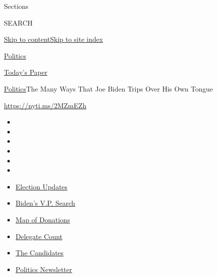 Sections

SEARCH

\protect\hyperlink{site-content}{Skip to
content}\protect\hyperlink{site-index}{Skip to site index}

\href{https://www.nytimes.com/section/politics}{Politics}

\href{https://myaccount.nytimes.com/auth/login?response_type=cookie\&client_id=vi}{}

\href{https://www.nytimes.com/section/todayspaper}{Today's Paper}

\href{/section/politics}{Politics}\textbar{}The Many Ways That Joe Biden
Trips Over His Own Tongue

\url{https://nyti.ms/2MZmEZh}

\begin{itemize}
\item
\item
\item
\item
\item
\item
\end{itemize}

\begin{itemize}
\item
  \href{https://www.nytimes.com/2020/07/31/us/elections/biden-vs-trump.html?action=click\&pgtype=Article\&state=default\&region=TOP_BANNER\&context=storylines_menu}{Election
  Updates}
\item
  \href{https://www.nytimes.com/article/biden-vice-president-2020.html?action=click\&pgtype=Article\&state=default\&region=TOP_BANNER\&context=storylines_menu}{Biden's
  V.P. Search}
\item
  \href{https://www.nytimes.com/interactive/2020/07/24/us/politics/trump-biden-campaign-donors.html?action=click\&pgtype=Article\&state=default\&region=TOP_BANNER\&context=storylines_menu}{Map
  of Donations}
\item
  \href{https://www.nytimes.com/interactive/2020/us/elections/delegate-count-primary-results.html?action=click\&pgtype=Article\&state=default\&region=TOP_BANNER\&context=storylines_menu}{Delegate
  Count}
\item
  \href{https://www.nytimes.com/interactive/2019/us/politics/2020-presidential-candidates.html?action=click\&pgtype=Article\&state=default\&region=TOP_BANNER\&context=storylines_menu}{The
  Candidates}
\item
  \href{https://www.nytimes.com/newsletters/politics?action=click\&pgtype=Article\&state=default\&region=TOP_BANNER\&context=storylines_menu}{Politics
  Newsletter}
\end{itemize}


